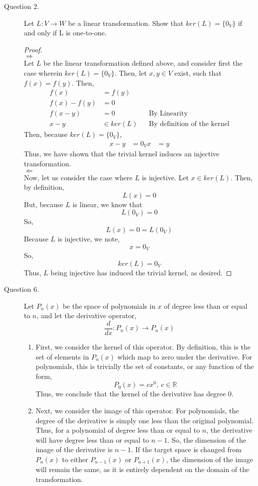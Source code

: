 \documentclass[letterpaper,10pt]{article}
\newcommand{\R}{\mathbb{R}}
\begin{document}
\begin{description}
\item[Question 2.] Let $L: V\to W$ be a linear transformation. Show that $ker(L)=\{0_V\}$ if and only if L is one-to-one. 
\begin{proof}\hfill\\
$\Rightarrow$\\
Let $L$ be the linear transformation defined above, and consider first the case wherein $ker(L)=\{0_V\}$. Then, let $x,y\in V$ exist, such that $f(x)=f(y)$. Then,
\begin{align*}
f(x)&=f(y)\\
f(x)-f(y) &= 0\\
f(x-y) &= 0 && \text{By Linearity}\\
x-y &\in ker(L) && \text{By definition of the kernel}
\end{align*}
Then, because $ker(L)=\{0_V\}$,
\begin{align*}
x-y &= 0_V
x &= y
\end{align*}
Thus, we have shown that the trivial kernel induces an injective transformation.\\
$\Leftarrow$\\
Now, let us consider the case where $L$ is injective. Let $x\in ker(L)$. Then, by definition,
\[L(x)=0\]
But, because $L$ is linear, we know that
\[L(0_V)=0\]
So,
\[L(x)=0=L(0_V)\]
Because $L$ is injective, we note,
\[x=0_V\]
So, 
\[ker(L)=0_V\]
Thus, $L$ being injective has induced the trivial kernel, as desired.
\end{proof}
\item[Question 6.] Let $P_n(x)$ be the space of polynomials in $x$ of degree less than or equal to $n$, and let the derivative operator,
\[\frac{d}{dx}:P_n(x)\to P_n(x)\]
\begin{enumerate}[label=\alph*.]
\item First, we consider the kernel of this operator. By definition, this is the set of elements in $P_n(x)$ which map to zero under the derivative. For polynomials, this is trivially the set of constants, or any function of the form,
\[P_0(x)=cx^0,\ c\in \R\]
Thus, we conclude that the kernel of the derivative has degree $0$.
\item Next, we consider the image of this operator. For polynomials, the degree of the derivative is simply one less than the original polynomial. Thus, for a polynomial of degree less than or equal to $n$, the derivative will have degree less than or equal to $n-1$. So, the dimension of the image of the derivative is $n-1$. If the target space is changed from $P_n(x)$ to either $P_{n-1}(x)$ or $P_{n+1}(x)$, the dimension of the image will remain the same, as it is entirely dependent on the domain of the transformation.

\end{enumerate}
\end{description}
\end{document}
